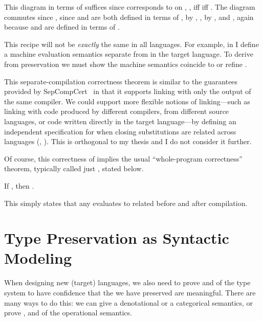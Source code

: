 \noindent This diagram in terms of  suffices since \im{\equiv}
corresponds to \im{\approx} on , \eg, \im{\struee \equiv \struee}
iff \im{\struee \approx \sembrace{\struee}} iff \im{\struee \approx \ttruee}.
The diagram commutes since \im{\seval{\ssubst(\se)} \equiv \ssubst(\se)}, since
 and  are both defined in terms of ,
\im{\ssubst(\se) \equiv \sembrace{\ssubst(\se)}} by ,
\im{\sembrace{\ssubst}(\sembrace{\se}) \equiv \sembrace{\ssubst(\se)}}, by
, and
\im{\teval{\sembrace{\ssubst}(\sembrace{\se})} \equiv
  {\sembrace{\ssubst}(\sembrace{\se})}}, again because  and
 are defined in terms of .

This recipe will not be \emph{exactly} the same in all languages.
For example, in  I define a machine evaluation semantics
separate from  in the target language.
To derive  from preservation  we
must show the machine semantics coincide to or refine .

This separate-compilation correctness theorem is similar to the guarantees
provided by SepCompCert~\cite{kang2016} in that it supports linking with only
the output of the same compiler.
We could support more flexible notions of linking---such as linking with code
produced by different compilers, from different source languages, or code
written directly in the target language---by defining an independent
specification for when closing substitutions are related across languages (\eg,
\cite{neis2015:pilsner,ahmed2011,new2016,perconti2014}).
This is orthogonal to my thesis and I do not consider it further.

Of course, this correctness of  implies the usual
``whole-program correctness'' theorem, typically called just , stated below.
\begin{corollary}
  If \im{\wf{}{\se}}, then
  \im{\seval{\se} \approx \sembrace{\teval{\se}}}.
\end{corollary}
\noindent This simply states that any  evaluates to related
 before and after compilation.

\section{Type Preservation as Syntactic Modeling}
When designing new  (target) languages, we also need to
prove  and  of the type system to
have confidence that the  we have preserved are meaningful.
There are many ways to do this: we can give a denotational or a
categorical semantics, or prove ,  and
 of the operational semantics.

